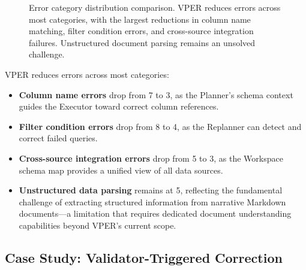\documentclass{article}
\begin{document}
\begin{figure}[t]
\centering
{}
\caption{Error category distribution comparison. VPER reduces errors across most categories, with the largest reductions in column name matching, filter condition errors, and cross-source integration failures. Unstructured document parsing remains an unsolved challenge.}
\label{fig:error-categories}
\end{figure}

VPER reduces errors across most categories:
\begin{itemize}[leftmargin=1.5em]
    \item \textbf{Column name errors} drop from 7 to 3, as the Planner's schema context guides the Executor toward correct column references.
    \item \textbf{Filter condition errors} drop from 8 to 4, as the Replanner can detect and correct failed queries.
    \item \textbf{Cross-source integration errors} drop from 5 to 3, as the Workspace schema map provides a unified view of all data sources.
    \item \textbf{Unstructured data parsing} remains at 5, reflecting the fundamental challenge of extracting structured information from narrative Markdown documents---a limitation that requires dedicated document understanding capabilities beyond VPER's current scope.
\end{itemize}

\subsection{Case Study: Validator-Triggered Correction}
\end{document}
